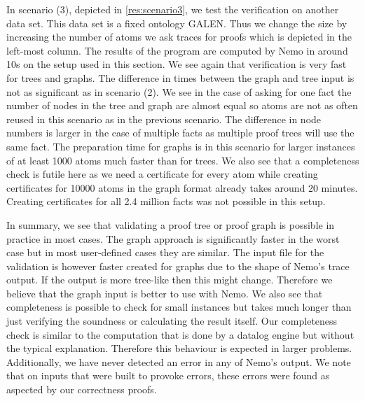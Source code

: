 In scenario (3), depicted in \cref{res:scenario3}, we test the verification on another data set. This data set is a fixed ontology GALEN. Thus we change the size by increasing the number of atoms we ask traces for proofs which is depicted in the left-most column. The results of the program are computed by Nemo in around 10s on the setup used in this section. We see again that verification is very fast for trees and graphs. The difference in times between the graph and tree input is not as significant as in scenario (2). We see in the case of asking for one fact the number of nodes in the tree and graph are almost equal so atoms are not as often reused in this scenario as in the previous scenario. The difference in node numbers is larger in the case of multiple facts as multiple proof trees will use the same fact. The preparation time for graphs is in this scenario for larger instances of at least 1000 atoms much faster than for trees. We also see that a completeness check is futile here as we need a certificate for every atom while creating certificates for 10000 atoms in the graph format already takes around 20 minutes. Creating certificates for all 2.4 million facts was not possible in this setup. 


In summary, we see that validating a proof tree or proof graph is possible in practice in most cases. The graph approach is significantly faster in the worst case but in most user-defined cases they are similar. The input file for the validation is however faster created for graphs due to the shape of Nemo's trace output. If the output is more tree-like then this might change. Therefore we believe that the graph input is better to use with Nemo. We also see that completeness is possible to check for small instances but takes much longer than just verifying the soundness or calculating the result itself. Our completeness check is similar to the computation that is done by a datalog engine but without the typical explanation. Therefore this behaviour is expected in larger problems. 
Additionally, we have never detected an error in any of Nemo's output. We note that on inputs that were built to provoke errors, these errors were found as aspected by our correctness proofs.